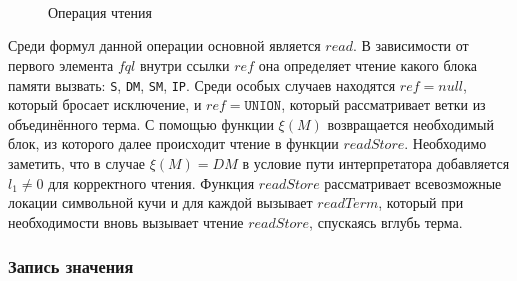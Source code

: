 \begin{figure}[H]
\centering
\tiny
\setlength{\jot}{1pt}
\begin{mymathbox}
 \\
 \\
 \\
\end{mymathbox}
\normalsize
\caption{Операция чтения} \label{fig:read}
\end{figure}

Среди формул данной операции основной является $read$. В зависимости от первого элемента $fql$ внутри ссылки $ref$ она определяет чтение какого блока памяти вызвать: \texttt{S}, \texttt{DM}, \texttt{SM}, \texttt{IP}. Среди особых случаев находятся $ref = null$, который бросает исключение, и $ref = \texttt{UNION}$, который рассматривает ветки из объединённого терма. С помощью функции $\xi(M)$ возвращается необходимый блок, из которого далее происходит чтение в функции $readStore$. Необходимо заметить, что в случае $\xi(M) = DM$ в условие пути интерпретатора добавляется $l_1 \neq 0$ для корректного чтения. Функция $readStore$ рассматривает всевозможные локации символьной кучи и для каждой вызывает $readTerm$, который при необходимости вновь вызывает чтение $readStore$, спускаясь вглубь терма.

\subsubsection{Запись значения}

